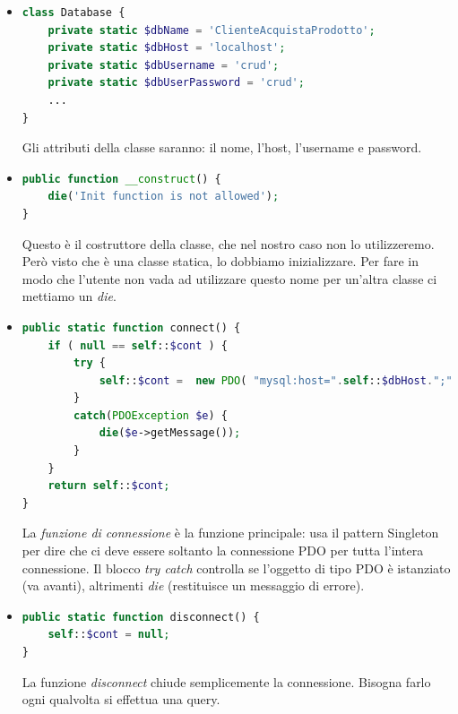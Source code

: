 \begin{itemize}

\item{}

\begin{lstlisting}[language=PHP]
class Database {
	private static $dbName = 'ClienteAcquistaProdotto';  
	private static $dbHost = 'localhost';
	private static $dbUsername = 'crud'; 
	private static $dbUserPassword = 'crud'; 
	...
}
\end{lstlisting}

Gli attributi della classe saranno: il nome, l’host, l’username e password.

\item{}

\begin{lstlisting}[language=PHP]
public function __construct() {
	die('Init function is not allowed');
} 
\end{lstlisting}

Questo è il costruttore della classe, che nel nostro caso non lo utilizzeremo. Però visto che è una classe statica, lo dobbiamo inizializzare. Per fare in modo che l’utente non vada ad utilizzare questo nome per un’altra classe ci mettiamo un \textit{die}.

\item{}

\begin{lstlisting}[language=PHP] 
public static function connect() {       
	if ( null == self::$cont ) {               
		try {                   
			self::$cont =  new PDO( "mysql:host=".self::$dbHost.";"."dbname=".self::$dbName,                    self::$dbUsername, self::$dbUserPassword);           
		} 
		catch(PDOException $e) {                    
			die($e->getMessage());           
		}       
	}        
	return self::$cont; 
}
\end{lstlisting}

La \textit{funzione di connessione} è la funzione principale: usa il pattern Singleton per dire che ci deve essere soltanto la connessione PDO per tutta l’intera connessione. Il blocco \textit{try catch} controlla se l’oggetto di tipo PDO è istanziato (va avanti), altrimenti \textit{die} (restituisce un messaggio di errore). 

\item{}

\begin{lstlisting}[language=PHP]
public static function disconnect() {      
	self::$cont = null;
} 
\end{lstlisting}

La funzione \textit{disconnect} chiude semplicemente la connessione. Bisogna farlo ogni qualvolta si effettua una query.  

\end{itemize}


